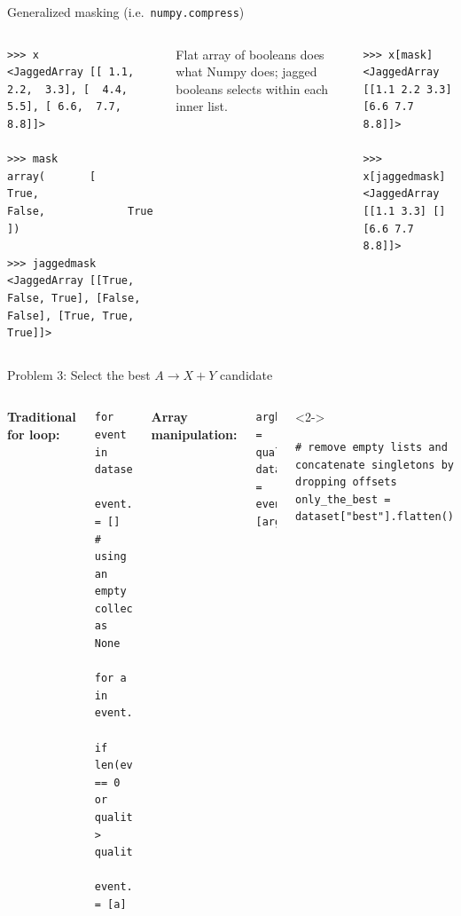 \documentclass[aspectratio=169]{beamer}
\begin{document}
\begin{frame}[fragile]{Generalized masking (i.e.\ \texttt{numpy.compress})}
\small
\begin{columns}
\begin{verbatim}
>>> x
<JaggedArray [[ 1.1,   2.2,  3.3], [  4.4,   5.5], [ 6.6,  7.7,  8.8]]>

>>> mask
array(       [        True,             False,             True      ])

>>> jaggedmask
<JaggedArray [[True, False, True], [False, False], [True, True, True]]>
\end{verbatim}

\vspace{0.5 cm}
\normalsize
Flat array of booleans does what Numpy does; jagged booleans selects within each inner list.

\small
\begin{verbatim}
>>> x[mask]
<JaggedArray [[1.1 2.2 3.3] [6.6 7.7 8.8]]>

>>> x[jaggedmask]
<JaggedArray [[1.1 3.3] [] [6.6 7.7 8.8]]>
\end{verbatim}
\end{columns}
\end{frame}

\begin{frame}[fragile]{Problem 3: Select the best $A \to X + Y$ candidate}
\vspace{0.5 cm}
\begin{columns}
{\bf Traditional for loop:} 
\small
\begin{verbatim}
for event in dataset:
    event.best = []              # using an empty collection as None
    for a in event.A:
        if len(event.best) == 0 or quality(a) > quality(event.best[0]):
            event.best = [a]
\end{verbatim}
\normalsize

\vspace{0.5 cm}
{\bf Array manipulation:} 
\small
\begin{verbatim}
argbest = quality(events["A"]).argmax()
dataset["best"] = events["A"][argbest]
\end{verbatim}

\vspace{0.05 cm}
\begin{uncoverenv}<2->
\begin{verbatim}
# remove empty lists and concatenate singletons by dropping offsets
only_the_best = dataset["best"].flatten()
\end{verbatim}
\end{uncoverenv}
\end{columns}
\end{frame}
\end{document}
